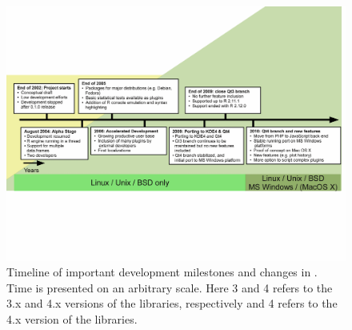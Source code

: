\begin{figure}[t!]
 \centering
 \includegraphics[clip=true,trim=0cm 5.7cm 0cm 5.7cm,width=15.4cm]{./figures/timeline.pdf}
 \caption{Timeline of important development milestones and changes in .
          Time is presented on an arbitrary scale. Here 3 and 4 refers to the 3.x and
          4.x versions of the  libraries, respectively and 4 refers to the
          4.x version of the  libraries.}
 \label{fig:timeline}
\end{figure}
